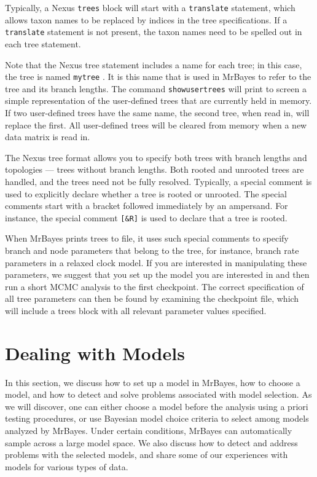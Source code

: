 \documentclass[12pt]{book}
\newcommand{\ttt}[1]{\texttt{#1} }
\begin{document}
Typically, a Nexus \ttt{trees} block will start with a \ttt{translate} statement, which allows
taxon names to be replaced by indices in the tree specifications. If a \ttt{translate} statement is
not present, the taxon names need to be spelled out in each tree statement.

Note that the Nexus tree statement includes a name for each tree; in this case, the tree is named
\ttt{mytree}. It is this name that is used in MrBayes to refer to the tree and its branch
lengths. The command \ttt{showusertrees} will print to screen a simple representation of the
user-defined trees that are currently held in memory. If two user-defined trees have the same name,
the second tree, when read in, will replace the first. All user-defined trees will be cleared from
memory when a new data matrix is read in.

The Nexus tree format allows you to specify both trees with branch lengths and topologies --- trees
without branch lengths. Both rooted and unrooted trees are handled, and the trees need not be fully
resolved.  Typically, a special comment is used to explicitly declare whether a tree is rooted or
unrooted. The special comments start with a bracket followed immediately by an ampersand. For
instance, the special comment \ttt{[\&R]} is used to declare that a tree is rooted.

When MrBayes prints trees to file, it uses such special comments to specify branch and node
parameters that belong to the tree, for instance, branch rate parameters in a relaxed clock model.
If you are interested in manipulating these parameters, we suggest that you set up the model you
are interested in and then run a short MCMC analysis to the first checkpoint. The correct
specification of all tree parameters can then be found by examining the checkpoint file, which will
include a trees block with all relevant parameter values specified.

\section{Dealing with Models}

In this section, we discuss how to set up a model in MrBayes, how to choose a model, and how to
detect and solve problems associated with model selection. As we will discover, one can either
choose a model before the analysis using a priori testing procedures, or use Bayesian model choice
criteria to select among models analyzed by MrBayes. Under certain conditions, MrBayes can
automatically sample across a large model space. We also discuss how to detect and address problems
with the selected models, and share some of our experiences with models for various types of data.
\end{document}
